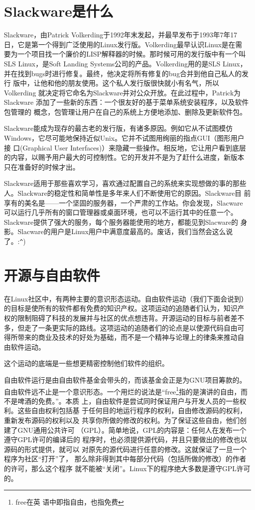 \section{Slackware是什么}
\label{sec:intro:whatIsSlackware}

Slackware，由Patrick Volkerding于1992年末发起，并最早发布于1993年7年17
日，它是第一个得到广泛使用的Linux发行版。Volkerding最早认识Linux是在需
要为一个项目找一个廉价的LISP解释器的时候。那时候可用的发行版中有一个叫
SLS Linux，是Soft Landing Systems公司的产品。Volkerding用的是SLS Linux，
并在找到bugs时进行修复。最终，他决定将所有修复的bug合并到他自己私人的发行
版中，让他和他的朋友使用。这个私人发行版很快就小有名气，所以Volkerding
就决定将它命名为Slackware并对公众开放。在此过程中，Patrick为Slackware
添加了一些新的东西：一个很友好的基于菜单系统安装程序，以及软件包管理的
概念，包管理让用户在自己的系统上方便地添加、删除及更新软件包。

Slackware能成为现存的最古老的发行版，有诸多原因。例如它从不试图模仿
Windows，它尽可能地保持近似Unix。它并不试图用绚丽的指点GUI（图形用户接
口(Graphical User Interfaces)）来隐藏一些操作。相反地，它让用户看到底层
的内容，以赐予用户最大的可控制性。它的开发并不是为了赶什么进度，新版本
只在准备好的时候才出。

Slackware适用于那些喜欢学习，喜欢通过配置自己的系统来实现想做的事的那些
人。Slackware的稳定性和简单性是多年来人们不断使用它的原因。Slackware目
前享有的美名是——一个坚固的服务器，一个严肃的工作站。你会发现，Slacware
可以运行几乎所有的窗口管理器或桌面环境，也可以不运行其中的任意一个。
Slackware提供了强大的服务，每个服务器能使用的地方，都能见到Slacware的
身影。Slacware的用户是Linux用户中满意度最高的。废话，我们当然会这么说
了。:\verb|^|)

\section{开源与自由软件}
\label{sec:intro:openSourceandFreeSoftware}

在Linux社区中，有两种主要的意识形态运动。自由软件运动（我们下面会说到）
的目标是使所有的软件都有免费的知识产权。这项运动的追随者们认为，知识产
权的限制阻碍了科技的发展并与社区的优点想违背。开源运动的目标与前者差不
多，但走了一条更实际的路线。这项运动的追随者们的论点是以使源代码自由可
得所带来的商业及技术的好处为基础，而不是一个精神与论理上的律条来推动自
由软件运动。

这个运动的底端是一些想更精密控制他们软件的组织。

自由软件运行是由自由软件基金会带头的，而该基金会正是为GNU项目筹款的。
自由软件远不止是一个意识形态。一个用烂的说法是``free\footnote{free在英
  语中即指自由，也指免费}指的是演讲的自由，而不是啤酒的免费。''。本质
上，自由软件是尝试同时保证用户与开发人员的一些权利。这些自由权利包括基
于任何目的地运行程序的权利，自由修改源码的权利，重新发布源码的权利以及
共享你所做的修改的权利。为了保证这些自由，他们创建了GNU通用公共许可
（GPL）。简单地说，GPL的内容是：任何人在发布一个遵守GPL许可的编译后的
程序时，也必须提供源代码，并且只要做出的修改也以源码的形式提供，就可以
对原先的源代码进行任意的修改。这就保证了一旦一个程序为社区``打开''了，
那么除非得到其中每部分代码（包括所做的修改）的作者的许可，那么这个程序
就不能被``关闭''。Linux下的程序绝大多数是遵守GPL许可的。

